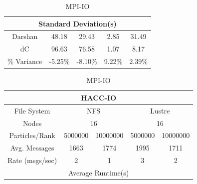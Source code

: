 \begin{table}[h]
\begin{subtable}[h]{0.5\textwidth}
\begin{tabular}{|ccccc|}
        \multicolumn{5}{|c|}{Standard Deviation(s)}                                                                                                 \\ \hline
        \multicolumn{1}{|c|}{Darshan}         & \multicolumn{1}{c|}{48.18}   & \multicolumn{1}{c|}{29.43}   & \multicolumn{1}{c|}{2.85}   & 31.49   \\ \hline
        \multicolumn{1}{|c|}{dC}              & \multicolumn{1}{c|}{96.63}   & \multicolumn{1}{c|}{76.58}   & \multicolumn{1}{c|}{1.07}   & 8.17    \\ \hline
        \multicolumn{1}{|c|}{\% Variance}     & \multicolumn{1}{c|}{-5.25\%} & \multicolumn{1}{c|}{-8.10\%} & \multicolumn{1}{c|}{9.22\%} & 2.39\%  \\ \hline
        \end{tabular}
    \caption{MPI-IO} 
    \label{subtable:mpi-io-test}
    \vspace{0.5cm}
    \end{subtable}
    \begin{subtable}[h]{0.5\textwidth}
        \centering
        \setlength\tabcolsep{5.5pt}
        \begin{tabular}{|ccccc|}
        \hline
        \multicolumn{5}{|c|}{HACC-IO}                                                                                                                    \\ \hline
        \multicolumn{1}{|c|}{File System}     & \multicolumn{2}{c|}{NFS}                                      & \multicolumn{2}{c|}{Lustre}              \\ \hline
        \multicolumn{1}{|c|}{Nodes}           & \multicolumn{2}{c|}{16}                                       & \multicolumn{2}{c|}{16}                  \\ \hline
        \multicolumn{1}{|c|}{Particles/Rank}  & \multicolumn{1}{c|}{5000000}  & \multicolumn{1}{c|}{10000000} & \multicolumn{1}{c|}{5000000}  & 10000000 \\ \hline
        \multicolumn{1}{|c|}{Avg. Messages}   & \multicolumn{1}{c|}{1663}     & \multicolumn{1}{c|}{1774}     & \multicolumn{1}{c|}{1995}     & 1711     \\ \hline
        \multicolumn{1}{|c|}{Rate (msgs/sec)} & \multicolumn{1}{c|}{2}        & \multicolumn{1}{c|}{1}        & \multicolumn{1}{c|}{3}        & 2        \\ \hline
        \multicolumn{5}{|c|}{Average Runtime(s)}                                                                                                        \\ \hline

\end{tabular}
\end{subtable}
\end{table}
